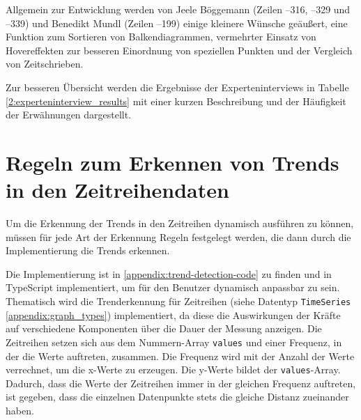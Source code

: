 Allgemein zur Entwicklung werden von Jeele Böggemann (Zeilen --316, --329 und --339) und Benedikt Mundl (Zeilen --199) einige kleinere Wünsche geäußert, eine Funktion zum Sortieren von Balkendiagrammen, vermehrter Einsatz von Hovereffekten zur besseren Einordnung von speziellen Punkten und der Vergleich von Zeitschrieben.

Zur besseren Übersicht werden die Ergebnisse der Experteninterviews in Tabelle \ref{2:experteninterview_results} mit einer kurzen Beschreibung und der Häufigkeit der Erwähnungen dargestellt.
\newpage

\newpage

\section{Regeln zum Erkennen von Trends in den Zeitreihendaten}
Um die Erkennung der Trends in den Zeitreihen dynamisch ausführen zu können, müssen für jede Art der Erkennung Regeln festgelegt werden, die dann durch die Implementierung die Trends erkennen.

Die Implementierung ist in \ref{appendix:trend-detection-code} zu finden und in TypeScript implementiert, um für den Benutzer dynamisch anpassbar zu sein. Thematisch wird die Trenderkennung für Zeitreihen (siehe Datentyp \texttt{TimeSeries} \ref{appendix:graph_types}) implementiert, da diese die Auswirkungen der Kräfte auf verschiedene Komponenten über die Dauer der Messung anzeigen. Die Zeitreihen setzen sich aus dem Nummern-Array \texttt{values} und einer Frequenz, in der die Werte auftreten, zusammen. Die Frequenz wird mit der Anzahl der Werte verrechnet, um die x-Werte zu erzeugen. Die y-Werte bildet der \texttt{values}-Array. Dadurch, dass die Werte der Zeitreihen immer in der gleichen Frequenz auftreten, ist gegeben, dass die einzelnen Datenpunkte stets die gleiche Distanz zueinander haben.

